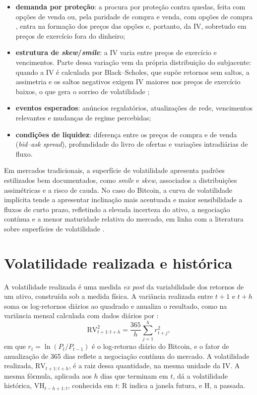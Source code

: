 \begin{itemize}
    \item \textbf{demanda por proteção}: a procura por proteção contra quedas,
          feita com opções de venda ou, pela paridade de compra e venda, com
          opções de compra \citep{hull2018options}, entra na formação dos
          preços das opções e, portanto, da IV, sobretudo em preços de
          exercício fora do dinheiro;
    \item \textbf{estrutura de \textit{skew}/\textit{smile}}: a IV varia entre
          preços de exercício e vencimentos. Parte dessa variação vem da
          própria distribuição do subjacente: quando a IV é calculada por
          Black--Scholes, que supõe retornos sem saltos, a assimetria e os
          saltos negativos exigem IV maiores nos preços de exercício baixos,
          o que gera o sorriso de volatilidade \citep{pan2006jumpRisk,
          gatheral2011volsurface};
    \item \textbf{eventos esperados}: anúncios regulatórios, atualizações de rede,
          vencimentos relevantes e mudanças de regime percebidas;
    \item \textbf{condições de liquidez}: diferença entre os preços de compra e
          de venda (\textit{bid--ask spread}), profundidade
          do livro de ofertas e variações intradiárias de fluxo.
\end{itemize}

Em mercados tradicionais, a superfície de volatilidade apresenta padrões
estilizados bem documentados, como \textit{smile} e \textit{skew}, associados a
distribuições assimétricas e a risco de cauda. No caso do Bitcoin, a curva de
volatilidade implícita tende a apresentar inclinação mais acentuada e maior
sensibilidade a fluxos de curto prazo, refletindo a elevada incerteza do ativo,
a negociação contínua e a menor maturidade relativa do mercado, em linha com a
literatura sobre superfícies de volatilidade \citep{gatheral2011volsurface}.

\section{Volatilidade realizada e histórica}
\label{sec:refer-rv}

A volatilidade realizada é uma medida \textit{ex post} da variabilidade dos
retornos de um ativo, construída sob a medida física. A variância realizada
entre $t+1$ e $t+h$ soma os log-retornos diários ao quadrado e anualiza o
resultado, como na variância mensal calculada com dados diários por
\citet{french1987expected}:
\[
\text{RV}^2_{t+1:t+h} = \frac{365}{h} \sum_{j=1}^{h} r_{t+j}^2,
\]
em que $r_t = \ln(P_t / P_{t-1})$ é o log-retorno diário do Bitcoin, e o fator
de anualização de 365 dias reflete a negociação contínua do mercado. A
volatilidade realizada, $\text{RV}_{t+1:t+h}$, é a raiz dessa quantidade, na
mesma unidade da IV. A mesma fórmula, aplicada aos $h$ dias que terminam em
$t$, dá a volatilidade histórica, $\text{VH}_{t-h+1:t}$, conhecida em $t$: R
indica a janela futura, e H, a passada.

